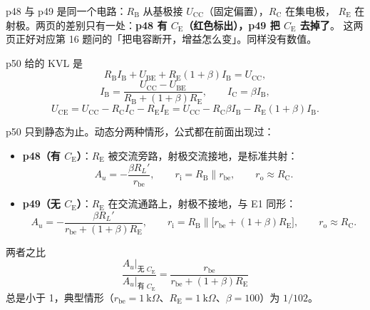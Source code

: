 \documentclass[11pt]{ctexart}
\begin{document}

p48 与 p49 是同一个电路：$R_{\mathrm{B}}$ 从基极接 $U_{\mathrm{CC}}$（固定偏置），$R_{\mathrm{C}}$ 在集电极，
$R_{\mathrm{E}}$ 在射极。两页的差别只有一处：\textbf{p48 有 $C_{\mathrm{E}}$（红色标出），p49 把 $C_{\mathrm{E}}$ 去掉了}。
这两页正好对应第 16 题问的「把电容断开，增益怎么变」。同样没有数值。


p50 给的 KVL 是
\[
R_{\mathrm{B}}I_{\mathrm{B}}+U_{\mathrm{BE}}+R_{\mathrm{E}}(1+\beta)I_{\mathrm{B}}=U_{\mathrm{CC}},
\]
\[
I_{\mathrm{B}}=\frac{U_{\mathrm{CC}}-U_{\mathrm{BE}}}{R_{\mathrm{B}}+(1+\beta)R_{\mathrm{E}}},\qquad
I_{\mathrm{C}}=\beta I_{\mathrm{B}},
\]
\[
U_{\mathrm{CE}}=U_{\mathrm{CC}}-R_{\mathrm{C}}I_{\mathrm{C}}-R_{\mathrm{E}}I_{\mathrm{E}}
=U_{\mathrm{CC}}-R_{\mathrm{C}}\beta I_{\mathrm{B}}-R_{\mathrm{E}}(1+\beta)I_{\mathrm{B}} .
\]



p50 只到静态为止。动态分两种情形，公式都在前面出现过：
\begin{itemize}
\item \textbf{p48（有 $C_{\mathrm{E}}$）}：$R_{\mathrm{E}}$ 被交流旁路，射极交流接地，是标准共射：
\[
A_u=-\frac{\beta R_L'}{r_{\mathrm{be}}},\qquad
r_{\mathrm{i}}=R_{\mathrm{B}}\parallel r_{\mathrm{be}},\qquad r_{\mathrm{o}}\approx R_{\mathrm{C}} .
\]
\item \textbf{p49（无 $C_{\mathrm{E}}$）}：$R_{\mathrm{E}}$ 在交流通路上，射极不接地，与 E1 同形：
\[
A_u=-\frac{\beta R_L'}{r_{\mathrm{be}}+(1+\beta)R_{\mathrm{E}}},\qquad
r_{\mathrm{i}}=R_{\mathrm{B}}\parallel\bigl[r_{\mathrm{be}}+(1+\beta)R_{\mathrm{E}}\bigr],\qquad r_{\mathrm{o}}\approx R_{\mathrm{C}} .
\]
\end{itemize}
两者之比
\[
\frac{A_u\big|_{\text{无 }C_{\mathrm{E}}}}{A_u\big|_{\text{有 }C_{\mathrm{E}}}}
=\frac{r_{\mathrm{be}}}{r_{\mathrm{be}}+(1+\beta)R_{\mathrm{E}}}
\]
总是小于 1，典型情形（$r_{\mathrm{be}}=1\ \mathrm{k}\Omega$、$R_{\mathrm{E}}=1\ \mathrm{k}\Omega$、$\beta=100$）为 $1/102$。
\end{document}
